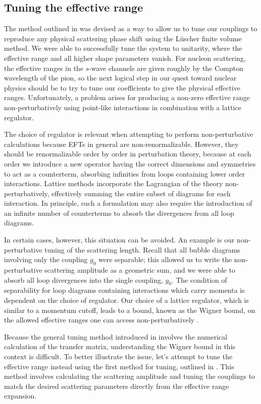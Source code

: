 \subsection{Tuning the effective range}
The method outlined in  was devised as a way to allow us to tune our couplings to reproduce any physical scattering phase shift using the L\"uscher finite volume method. We were able to successfully tune the system to unitarity, where the effective range and all higher shape parameters vanish. For nucleon scattering, the effective ranges in the $s$-wave channels are given roughly by the Compton wavelength of the pion, so the next logical step in our quest toward nuclear physics should be to try to tune our coefficients to give the physical effective ranges. Unfortunately, a problem arises for producing a non-zero effective range non-perturbatively using point-like interactions in combination with a lattice regulator. 

The choice of regulator is relevant when attempting to perform non-perturbative calculations because EFTs in general are non-renormalizable. However, they should be renormalizable order by order in perturbation theory, because at each order we introduce a new operator having the correct dimensions and symmetries to act as a counterterm, absorbing infinities from loops containing lower order interactions. Lattice methods incorporate the Lagrangian of the theory non-perturbatively, effectively summing the entire subset of diagrams for each interaction. In principle, such a formulation may also require the introduction of an infinite number of counterterms to absorb the divergences from all loop diagrams. 

In certain cases, however, this situation can be avoided. An example is our non-perturbative tuning of the scattering length. Recall that all bubble diagrams involving only the coupling $g_0$ were separable; this allowed us to write the non-perturbative scattering amplitude as a geometric sum, and we were able to absorb all loop divergences into the single coupling, $g_0$. The condition of separability for loop diagrams containing interactions which carry momenta is dependent on the choice of regulator. Our choice of a lattice regulator, which is similar to a momentum cutoff, leads to a bound, known as the Wigner bound, on the allowed effective ranges one can access non-perturbatively \cite{PhysRev.98.145,Phillips:1996ae,Cohen:1996my}.

Because the general tuning method introduced in  involves the numerical calculation of the transfer matrix, understanding the Wigner bound in this context is difficult. To better illustrate the issue, let's attempt to tune the effective range instead using the first method for tuning, outlined in . This method involves calculating the scattering amplitude and tuning the couplings to match the desired scattering parameters directly from the effective range expansion. 

